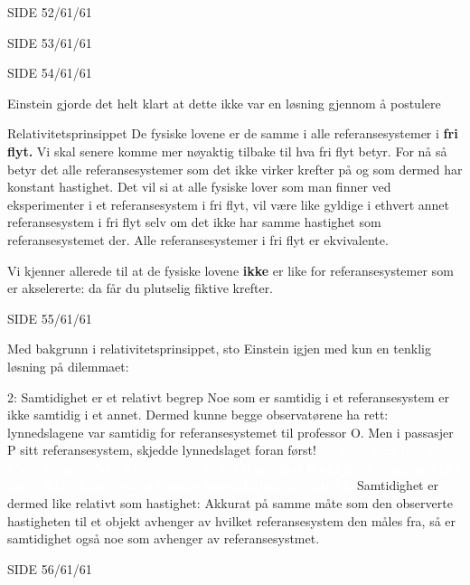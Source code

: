 \documentclass{beamer}
\begin{document}
\begin{frame}
{
  \Huge
{}
}{SIDE 52/61/61}

{
  \Huge
{}
}{SIDE 53/61/61}

{
  \huge
{}
}{SIDE 54/61/61}

{
  \large
Einstein gjorde det helt klart at dette ikke var en løsning gjennom å postulere
\begin{block}{Relativitetsprinsippet}
De fysiske lovene er de samme i alle referansesystemer i {\bf fri flyt.} Vi skal senere komme mer nøyaktig tilbake til hva fri flyt betyr. For nå så betyr det alle referansesystemer som det ikke virker krefter på og som dermed har konstant hastighet. Det vil si at alle fysiske lover som man finner ved eksperimenter i et referansesystem i fri flyt, vil være like gyldige i ethvert annet referansesystem i fri flyt selv om det ikke har samme hastighet som referansesystemet der. Alle referansesystemer i fri flyt er ekvivalente.
\end{block}
Vi kjenner allerede til at de fysiske lovene {\bf ikke} er like for referansesystemer som er akselererte: da får du plutselig fiktive krefter.
}{SIDE 55/61/61}

{
  \large
Med bakgrunn i relativitetsprinsippet, sto Einstein igjen med kun en tenklig løsning på dilemmaet:
\begin{block}{2: Samtidighet er et relativt begrep}
Noe som er samtidig i et referansesystem er ikke samtidig i et annet. Dermed kunne begge observatørene ha rett: lynnedslagene var samtidig for referansesystemet til professor O. Men i passasjer P sitt referansesystem, skjedde lynnedslaget foran først! \textcolor{white}{Og vi snakker ikke om en tilsynelatende effekt: I togsystemet så {\bf slo lynet ned foran først}, punktum! Det ene er ikke riktigere enn det andre, {\bf samtidighet er relativt.}} Samtidighet er dermed like relativt som hastighet: Akkurat på samme måte som den observerte hastigheten til et objekt avhenger av hvilket referansesystem den måles fra, så er samtidighet også noe som avhenger av referansesystmet.
\end{block}
}{SIDE 56/61/61}



\end{frame}
\end{document}
